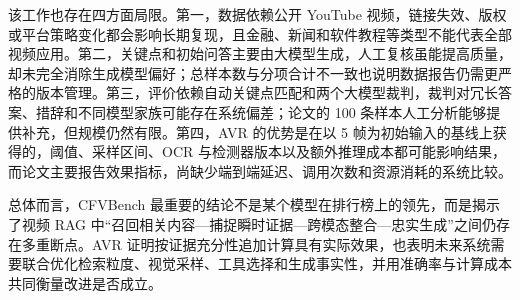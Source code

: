 该工作也存在四方面局限。第一，数据依赖公开 YouTube 视频，链接失效、版权或平台策略变化都会影响长期复现，且金融、新闻和软件教程等类型不能代表全部视频应用。第二，关键点和初始问答主要由大模型生成，人工复核虽能提高质量，却未完全消除生成模型偏好；总样本数与分项合计不一致也说明数据报告仍需更严格的版本管理。第三，评价依赖自动关键点匹配和两个大模型裁判，裁判对冗长答案、措辞和不同模型家族可能存在系统偏差；论文的 100 条样本人工分析能够提供补充，但规模仍然有限。第四，AVR 的优势是在以 5 帧为初始输入的基线上获得的，阈值、采样区间、OCR 与检测器版本以及额外推理成本都可能影响结果，而论文主要报告效果指标，尚缺少端到端延迟、调用次数和资源消耗的系统比较。

总体而言，CFVBench 最重要的结论不是某个模型在排行榜上的领先，而是揭示了视频 RAG 中“召回相关内容—捕捉瞬时证据—跨模态整合—忠实生成”之间仍存在多重断点。AVR 证明按证据充分性追加计算具有实际效果，也表明未来系统需要联合优化检索粒度、视觉采样、工具选择和生成事实性，并用准确率与计算成本共同衡量改进是否成立。
